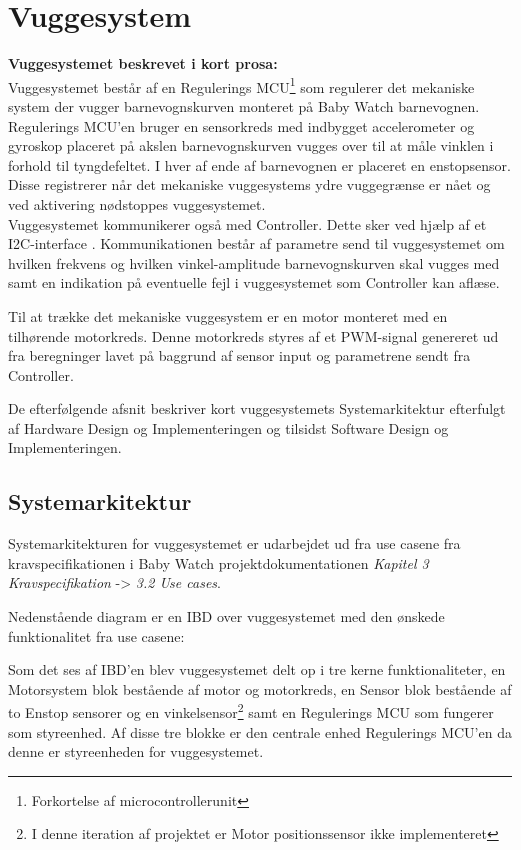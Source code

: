 \chapter{Vuggesystem}
\label{vuggesys}
\textbf{Vuggesystemet beskrevet i kort prosa:} \\
Vuggesystemet består af en Regulerings MCU\footnote{Forkortelse af microcontrollerunit} som regulerer det mekaniske system der vugger barnevognskurven monteret på Baby Watch barnevognen. \\ Regulerings MCU'en bruger en sensorkreds med indbygget accelerometer og gyroskop placeret på akslen barnevognskurven vugges over til at måle vinklen i forhold til tyngdefeltet. I hver af ende af barnevognen er placeret en enstopsensor. Disse registrerer når det mekaniske vuggesystems ydre vuggegrænse er nået og ved aktivering nødstoppes vuggesystemet. \\ Vuggesystemet kommunikerer også med Controller. Dette sker ved hjælp af et I2C-interface \citep{I2C}. Kommunikationen består af parametre send til vuggesystemet om hvilken frekvens og hvilken vinkel-amplitude barnevognskurven skal vugges med samt en indikation på eventuelle fejl i vuggesystemet som Controller kan aflæse.

Til at trække det mekaniske vuggesystem er en motor monteret med en tilhørende motorkreds. Denne motorkreds styres af et PWM-signal genereret ud fra beregninger lavet på baggrund af sensor input og parametrene sendt fra Controller.

De efterfølgende afsnit beskriver kort vuggesystemets Systemarkitektur efterfulgt af Hardware Design og Implementeringen og tilsidst Software Design og Implementeringen.
\newpage
\section{Systemarkitektur}
\label{vs_sysark}
Systemarkitekturen for vuggesystemet er udarbejdet ud fra use casene fra kravspecifikationen i Baby Watch projektdokumentationen \textit{Kapitel 3 Kravspecifikation} -> \textit{3.2 Use cases}.

Nedenstående diagram er en IBD over vuggesystemet med den ønskede funktionalitet fra use casene:


Som det ses af IBD'en blev vuggesystemet delt op i tre kerne funktionaliteter, en Motorsystem blok bestående af motor og motorkreds, en Sensor blok bestående af to Enstop sensorer og en vinkelsensor\footnote{I denne iteration af projektet er Motor positionssensor ikke implementeret} samt en Regulerings MCU som fungerer som styreenhed. Af disse tre blokke er den centrale enhed Regulerings MCU'en da denne er styreenheden for vuggesystemet.


